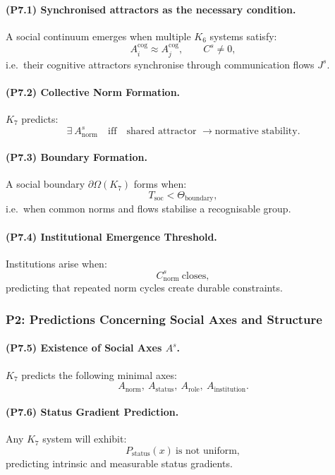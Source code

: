 \paragraph{(P7.1) Synchronised attractors as the necessary condition.}
A social continuum emerges when multiple $K_6$ systems satisfy:
\[
A_i^{\mathrm{cog}} \approx A_j^{\mathrm{cog}},
\qquad
C^s \neq 0,
\]
i.e.\ their cognitive attractors synchronise through communication flows $J^s$.

\paragraph{(P7.2) Collective Norm Formation.}
$K_7$ predicts:
\[
\exists \ A_{\mathrm{norm}}^s \quad \text{iff} \quad
\text{shared attractor } \to \text{normative stability}.
\]

\paragraph{(P7.3) Boundary Formation.}
A social boundary $\partial\Omega(K_7)$ forms when:
\[
T_{\mathrm{soc}} < \Theta_{\mathrm{boundary}},
\]
i.e.\ when common norms and flows stabilise a recognisable group.

\paragraph{(P7.4) Institutional Emergence Threshold.}
Institutions arise when:
\[
C_{\mathrm{norm}}^s \ \text{closes},
\]
predicting that repeated norm cycles create durable constraints.

\subsubsection{P2: Predictions Concerning Social Axes and Structure}

\paragraph{(P7.5) Existence of Social Axes \texorpdfstring{$A^s$}{A^s}.}
$K_7$ predicts the following minimal axes:
\[
A_{\mathrm{norm}}, \
A_{\mathrm{status}},\
A_{\mathrm{role}}, \
A_{\mathrm{institution}}.
\]

\paragraph{(P7.6) Status Gradient Prediction.}
Any $K_7$ system will exhibit:
\[
P_{\mathrm{status}}(x) \ \text{is not uniform},
\]
predicting intrinsic and measurable status gradients.

